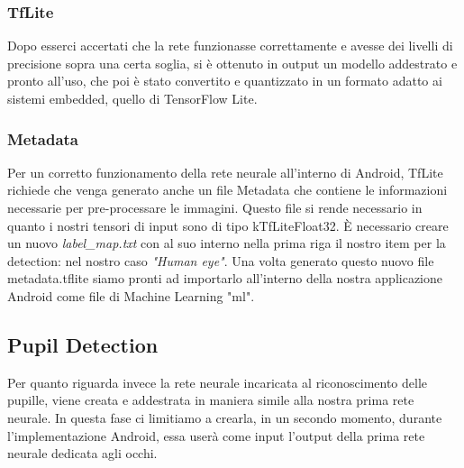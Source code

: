\documentclass[11pt]{article}
\begin{document}
\subsubsection{TfLite}
Dopo esserci accertati che la rete funzionasse correttamente e avesse dei livelli di precisione sopra una certa soglia, si è ottenuto in output un modello addestrato
e pronto all’uso, che poi è stato convertito e quantizzato in un formato adatto ai sistemi embedded, quello di TensorFlow Lite.
\subsubsection{Metadata}
Per un corretto funzionamento della rete neurale all'interno di Android, TfLite richiede che venga generato anche un file Metadata che contiene le informazioni necessarie per pre-processare le immagini. Questo file si rende necessario in quanto i nostri tensori di input sono di tipo kTfLiteFloat32. È necessario creare un nuovo \textit{label\_map.txt} con al suo interno nella prima riga il nostro item per la detection: nel nostro caso \textit{"Human eye"}.
\newline
Una volta generato questo nuovo file metadata.tflite siamo pronti ad importarlo all'interno della nostra applicazione Android come file di Machine Learning "ml".

\newpage    
\subsection{Pupil Detection}
Per quanto riguarda invece la rete neurale incaricata al riconoscimento delle pupille, viene creata e addestrata in maniera simile alla nostra prima rete neurale. In questa fase ci limitiamo a crearla, in un secondo momento, durante l'implementazione Android, essa userà come input l'output della prima rete neurale dedicata agli occhi. 
\end{document}
